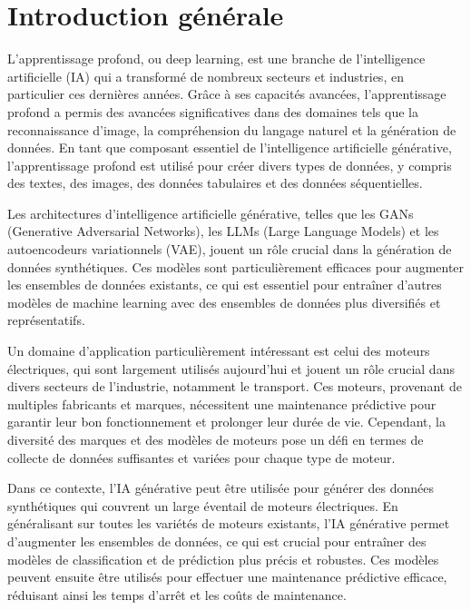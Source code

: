 \chapter*{Introduction générale}
\label{chap:introduction}


L'apprentissage profond, ou deep learning, est une branche de l'intelligence artificielle (IA) 
qui a transformé de nombreux secteurs et industries, en particulier ces dernières années. 
Grâce à ses capacités avancées, l'apprentissage profond a permis des avancées significatives
dans des domaines tels que la reconnaissance d'image, la compréhension du langage naturel et 
la génération de données. En tant que composant essentiel de l'intelligence artificielle générative, 
l'apprentissage profond est utilisé pour créer divers types de données, 
y compris des textes, des images, des données tabulaires et des données séquentielles.

\medskip

Les architectures d'intelligence artificielle générative, telles que les GANs (Generative Adversarial Networks),
 les LLMs (Large Language Models) et les autoencodeurs variationnels (VAE), jouent un rôle crucial dans la génération 
 de données synthétiques. Ces modèles sont particulièrement efficaces pour augmenter les ensembles de données existants,
  ce qui est essentiel pour entraîner d'autres modèles de machine learning avec des ensembles de données plus diversifiés
   et représentatifs.


\medskip
Un domaine d'application particulièrement intéressant est celui des moteurs électriques, 
qui sont largement utilisés aujourd'hui et jouent un rôle crucial dans divers secteurs de l'industrie, 
notamment le transport. Ces moteurs, provenant de multiples fabricants et marques, nécessitent une
maintenance prédictive pour garantir leur bon fonctionnement et prolonger leur durée de vie. Cependant, 
la diversité des marques
et des modèles de moteurs pose un défi en termes de collecte de données suffisantes et
variées pour chaque type de moteur.


\medskip
Dans ce contexte, l'IA générative peut être utilisée pour générer des données
synthétiques qui couvrent un large éventail de moteurs électriques. En généralisant
sur toutes les variétés de moteurs existants, l'IA générative permet d'augmenter les
ensembles de données, ce qui est crucial pour entraîner des modèles de classification
et de prédiction plus précis et robustes. Ces modèles peuvent ensuite être utilisés pour
effectuer une maintenance prédictive efficace, réduisant ainsi les temps d'arrêt et les coûts de maintenance.


